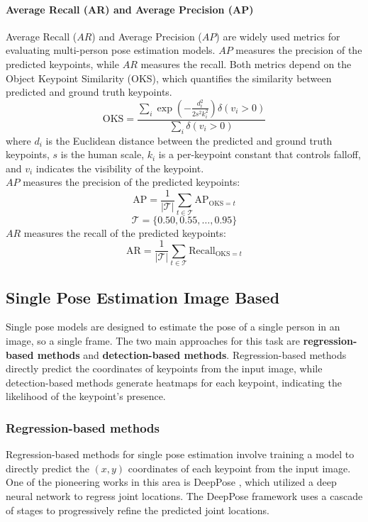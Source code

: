 \paragraph{Average Recall (AR) and Average Precision (AP)}
Average Recall ($AR$) and Average Precision ($AP$) are widely used metrics for evaluating multi-person pose estimation models. $AP$ measures the precision of the predicted keypoints, while $AR$ measures the recall. 
Both metrics depend on the Object Keypoint Similarity (OKS), which quantifies the similarity between predicted and ground truth keypoints.
\begin{equation}
    \mathrm{OKS} = \frac{\sum_i \exp\left(-\frac{d_i^2}{2s^2k_i^2}\right) \delta(v_i > 0)}{\sum_i \delta(v_i > 0)}
\end{equation}
where \(d_i\) is the Euclidean distance between the predicted and ground truth keypoints, \(s\) is the human scale, \(k_i\) is a per-keypoint constant that controls falloff, and \(v_i\) indicates the visibility of the keypoint.\\
$AP$ measures the precision of the predicted keypoints:
\begin{equation}
    \mathrm{AP} =
    \frac{1}{|\mathcal{T}|}
    \sum_{t \in \mathcal{T}}
    \mathrm{AP}_{\mathrm{OKS}=t}
\end{equation}
\begin{equation}
    \mathcal{T} = \{0.50, 0.55, \dots, 0.95\}
\end{equation}
$AR$ measures the recall of the predicted keypoints:
\begin{equation}
    \mathrm{AR} =
    \frac{1}{|\mathcal{T}|}
    \sum_{t \in \mathcal{T}}
    \mathrm{Recall}_{\mathrm{OKS}=t}
\end{equation}



\subsection{Single Pose Estimation Image Based}
Single pose models are designed to estimate the pose of a single person in an image, so a single frame.
The two main approaches for this task are \textbf{regression-based methods} and \textbf{detection-based methods}. Regression-based methods directly predict the coordinates of keypoints from the input image, while detection-based methods 
generate heatmaps for each keypoint, indicating the likelihood of the keypoint's presence.

\subsubsection{Regression-based methods}
Regression-based methods for single pose estimation involve training a model to directly predict the \((x, y)\) coordinates of each keypoint from the input image. One of the pioneering works in this area 
is DeepPose \cite{toshev2014deeppose}, which utilized a deep neural network to regress joint locations. The DeepPose framework uses a cascade of stages to progressively refine the predicted joint locations.


